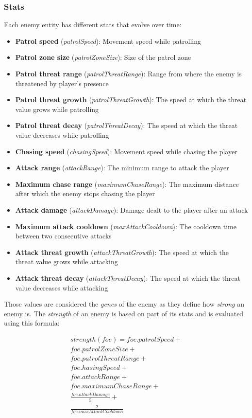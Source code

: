 \documentclass[11pt]{article}
\begin{document}
\subsubsection{Stats}
Each enemy entity has different stats that evolve over time:

\begin{itemize}
  \item \textbf{Patrol speed} (\textit{patrolSpeed}): Movement speed while patrolling
  \item \textbf{Patrol zone size} (\textit{patrolZoneSize}): Size of the patrol zone
  \item \textbf{Patrol threat range} (\textit{patrolThreatRange}): Range from where the enemy is threatened by player's presence
  \item \textbf{Patrol threat growth} (\textit{patrolThreatGrowth}): The speed at which the threat value grows while patrolling
  \item \textbf{Patrol threat decay} (\textit{patrolThreatDecay}): The speed at which the threat value decreases while patrolling

  \item \textbf{Chasing speed} (\textit{chasingSpeed}): Movement speed while chasing the player
  \item \textbf{Attack range} (\textit{attackRange}): The minimum range to attack the player
  \item \textbf{Maximum chase range} (\textit{maximumChaseRange}): The maximum distance after which the enemy stops chasing the player
  \item \textbf{Attack damage} (\textit{attackDamage}): Damage dealt to the player after an attack
  \item \textbf{Maximum attack cooldown} (\textit{maxAttackCooldown}): The cooldown time between two consecutive attacks
  \item \textbf{Attack threat growth} (\textit{attackThreatGrowth}): The speed at which the threat value grows while attacking
  \item \textbf{Attack threat decay} (\textit{attackThreatDecay}): The speed at which the threat value decreases while attacking
\end{itemize}

Those values are considered the \textit{genes} of the enemy as they define how \textit{strong} an enemy is. The \textit{strength} of an enemy is based on part of its stats and is evaluated using this formula:

\begin{gather*}
  strength(foe) =
    foe.patrolSpeed + \\
    foe.patrolZoneSize + \\
    foe.patrolThreatRange + \\
    foe.hasingSpeed + \\
    foe.attackRange + \\
    foe.maximumChaseRange + \\
    \frac{foe.attackDamage}{5} + \\
    \frac{2}{foe.maxAttackCooldown}
\end{gather*}
\end{document}
